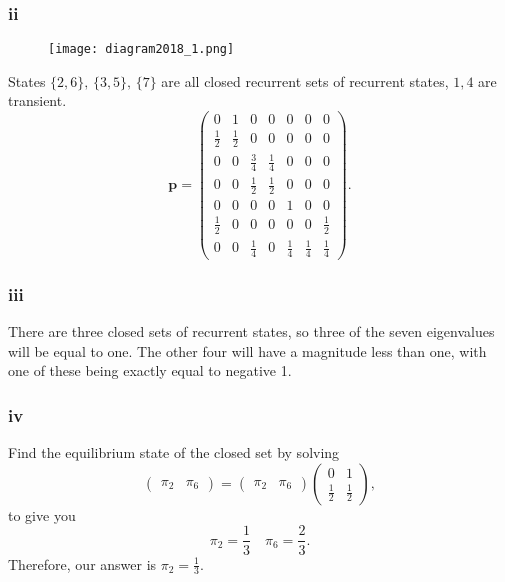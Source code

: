 \documentclass{article}
\begin{document}
\subsubsection{ii}
\begin{figure}[H]
    \centering
    \texttt{[image: diagram2018\_1.png]}
    \label{fig:1b}
\end{figure}
States $\{2,6\},\,\{3,5\},\,\{7\}$ are all closed recurrent sets of recurrent states, $1,4$ are transient.
\begin{equation}
    \mathbf{p} = \begin{pmatrix}
        0 & 1 & 0 & 0 & 0 & 0 & 0 \\
        \frac{1}{2} & \frac{1}{2} & 0 & 0 & 0 & 0 & 0 \\
        0 & 0 & \frac{3}{4} & \frac{1}{4} & 0 & 0 & 0 \\
        0 & 0 & \frac{1}{2} & \frac{1}{2} & 0 & 0 & 0 \\
        0 & 0 & 0 & 0 & 1 & 0 & 0 \\
        \frac{1}{2} & 0 & 0 & 0 & 0 & 0 & \frac{1}{2} \\
        0 & 0 & \frac{1}{4} & 0 & \frac{1}{4} & \frac{1}{4} & \frac{1}{4}
    \end{pmatrix}.\label{p_ii}
\end{equation}

\subsubsection{iii}
There are three closed sets of recurrent states, so three of the seven eigenvalues will be equal to one. The other four will have a magnitude less than one, with one of these being exactly equal to negative 1.

\subsubsection{iv}
Find the equilibrium state of the closed set by solving
\begin{equation}
    \begin{pmatrix}
    \pi_2 & \pi_6
    \end{pmatrix} = \begin{pmatrix}
    \pi_2 & \pi_6
    \end{pmatrix}\begin{pmatrix}
    0 & 1 \\ \frac{1}{2} & \frac{1}{2}
    \end{pmatrix},
\end{equation}
to give you 
\begin{equation}
    \pi_2 = \frac{1}{3} \quad \pi_6 = \frac{2}{3}.
\end{equation}
Therefore, our answer is $\pi_2 = \frac{1}{3}$. 
\end{document}

